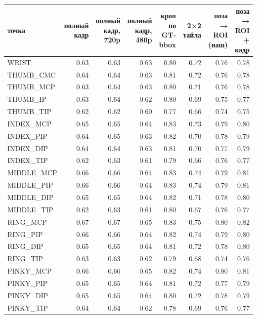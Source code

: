 \begin{tabular}{lrrrrrrr}
\toprule
точка & полный кадр & полный кадр, 720p & полный кадр, 480p & кроп по GT-bbox & 2×2 тайла & поза → ROI (наш) & поза → ROI + кадр \\
\midrule
WRIST & 0.63 & 0.63 & 0.63 & 0.80 & 0.72 & 0.76 & 0.78 \\
THUMB\_CMC & 0.64 & 0.64 & 0.63 & 0.81 & 0.72 & 0.76 & 0.78 \\
THUMB\_MCP & 0.63 & 0.64 & 0.63 & 0.80 & 0.71 & 0.76 & 0.78 \\
THUMB\_IP & 0.63 & 0.64 & 0.62 & 0.80 & 0.69 & 0.75 & 0.77 \\
THUMB\_TIP & 0.62 & 0.62 & 0.60 & 0.77 & 0.66 & 0.74 & 0.75 \\
INDEX\_MCP & 0.65 & 0.65 & 0.64 & 0.83 & 0.73 & 0.79 & 0.80 \\
INDEX\_PIP & 0.64 & 0.65 & 0.63 & 0.82 & 0.70 & 0.78 & 0.79 \\
INDEX\_DIP & 0.64 & 0.64 & 0.63 & 0.81 & 0.70 & 0.77 & 0.79 \\
INDEX\_TIP & 0.62 & 0.63 & 0.61 & 0.79 & 0.66 & 0.76 & 0.77 \\
MIDDLE\_MCP & 0.66 & 0.66 & 0.64 & 0.83 & 0.74 & 0.79 & 0.81 \\
MIDDLE\_PIP & 0.66 & 0.66 & 0.64 & 0.83 & 0.74 & 0.79 & 0.81 \\
MIDDLE\_DIP & 0.65 & 0.65 & 0.64 & 0.82 & 0.71 & 0.78 & 0.80 \\
MIDDLE\_TIP & 0.62 & 0.63 & 0.61 & 0.80 & 0.67 & 0.76 & 0.77 \\
RING\_MCP & 0.67 & 0.67 & 0.65 & 0.83 & 0.75 & 0.80 & 0.82 \\
RING\_PIP & 0.66 & 0.66 & 0.64 & 0.82 & 0.74 & 0.79 & 0.80 \\
RING\_DIP & 0.65 & 0.65 & 0.64 & 0.81 & 0.72 & 0.78 & 0.80 \\
RING\_TIP & 0.63 & 0.63 & 0.62 & 0.79 & 0.68 & 0.74 & 0.76 \\
PINKY\_MCP & 0.66 & 0.66 & 0.65 & 0.82 & 0.74 & 0.80 & 0.81 \\
PINKY\_PIP & 0.65 & 0.65 & 0.64 & 0.81 & 0.72 & 0.77 & 0.79 \\
PINKY\_DIP & 0.65 & 0.65 & 0.64 & 0.80 & 0.72 & 0.78 & 0.79 \\
PINKY\_TIP & 0.64 & 0.64 & 0.62 & 0.78 & 0.69 & 0.76 & 0.77 \\
\bottomrule
\end{tabular}

